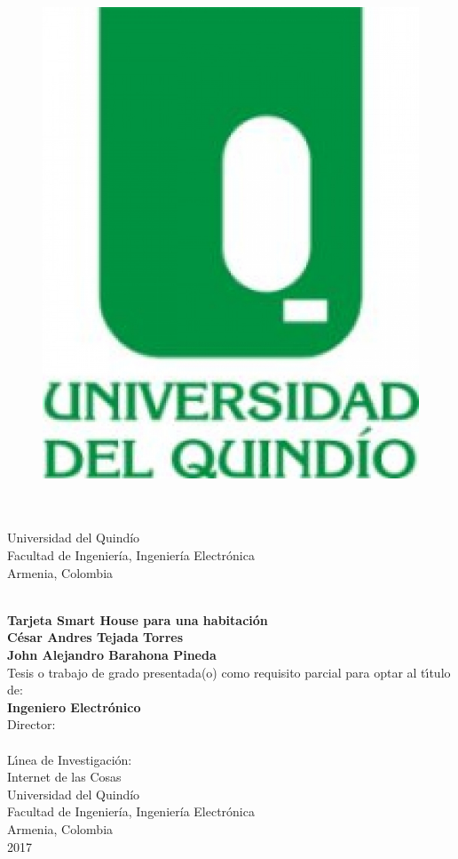 \begin{center}
	\begin{figure}
		\centering
		\includegraphics[width=0.2\linewidth]{Imagenes/escudo}
	\end{figure}
\thispagestyle{empty} \vspace*{2.0cm} \textbf{\huge
\tituloTesis}\\[5.0cm]
\Large\textbf{\autorTesis}\\[4.7cm] %
\small Universidad del Quindío\\
Facultad de Ingeniería, Ingeniería Electrónica\\
Armenia, Colombia\\
\anioTesis\\
\end{center}

\newpage{\pagestyle{empty}\cleardoublepage}


\newpage
\begin{center}
\thispagestyle{empty} \vspace*{0cm} \textbf{\huge
Tarjeta Smart House para una habitación}\\[3.0cm]
\Large\textbf{César Andres Tejada Torres\\John Alejandro Barahona Pineda}\\[3.0cm]
\small Tesis o trabajo de grado presentada(o) como requisito parcial para optar al
t\'{\i}tulo de:\\
\textbf{Ingeniero Electrónico}\\[2.1cm] %
Director:\\
\directorTesis\\[2.0cm]
L\'{\i}nea de Investigaci\'{o}n:\\
Internet de las Cosas\\
Universidad del Quindío\\
Facultad de Ingeniería, Ingeniería Electrónica\\
Armenia, Colombia\\
2017\\
\end{center}

\newpage{\pagestyle{empty}\cleardoublepage}


